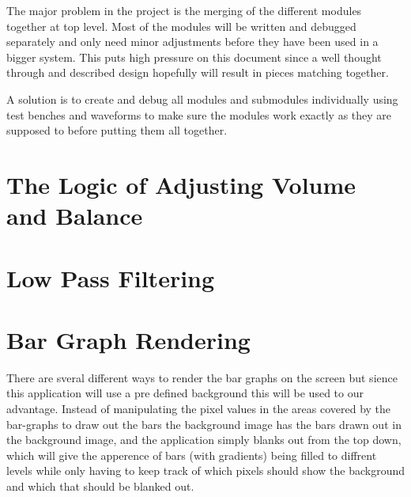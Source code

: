 

The major problem in the project is the merging of the different
modules together at top level. Most of the modules will be written and
debugged separately and only need minor adjustments before they have
been used in a bigger system.  This puts high pressure on this
document since a well thought through and described design hopefully
will result in pieces matching together.

A solution is to create and debug all modules and submodules
individually using test benches and waveforms to make sure the modules
work exactly as they are supposed to before putting them all together.

\section{The Logic of Adjusting Volume and Balance}


\section{Low Pass Filtering}


\section{Bar Graph Rendering}
 

There are sveral different ways to render the bar graphs on the
screen but sience this application will use a pre defined background
this will be used to our advantage. Instead of manipulating the pixel
values in the areas covered by the bar-graphs to draw out the
bars the background image has the bars drawn out in the background
image, and the application simply blanks out from the top down, which
will give the apperence of bars (with gradients) being filled to
diffrent levels while only having to keep track of which pixels should
show the background and which that should be blanked out.
